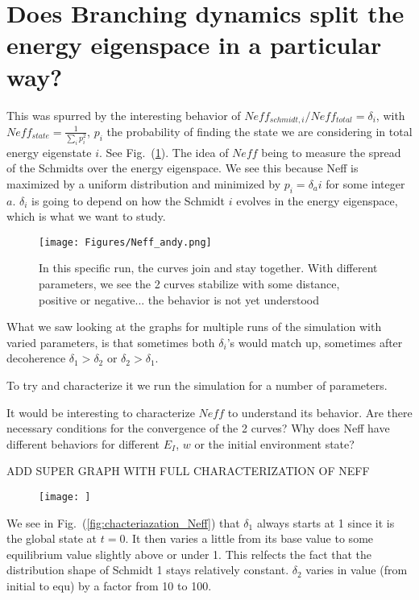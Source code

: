 \documentclass{article}
\begin{document}
\section{Does Branching dynamics split the energy eigenspace in a particular way?}

This was spurred by the interesting behavior of $Neff_{schmidt,i}/Neff_{total}=\delta_i$, with $Neff_{state}=\frac{1}{\sum_ip_i^2}$, $p_i$ the probability of finding the state we are considering in total energy eigenstate $i$. See Fig.~(\ref{fig:Neff_andy}). The idea of $Neff$ being to measure the spread of the Schmidts over the energy eigenspace. We see this because Neff is maximized by a uniform distribution and minimized by $p_i=\delta_ai$ for some integer $a$. $\delta_i$ is going to depend on how the Schmidt $i$ evolves in the energy eigenspace, which is what we want to study.

\begin{figure}
    \centering
    \texttt{[image: Figures/Neff\_andy.png]}
    \caption{In this specific run, the curves join and stay together. With different parameters, we see the 2 curves stabilize with some distance, positive or negative... the behavior is not yet understood}
    \label{fig:Neff_andy}
\end{figure}

What we saw looking at the graphs for multiple runs of the simulation with varied parameters, is that sometimes both $\delta_i$'s would match up, sometimes after decoherence $\delta_1>\delta_2$ or $\delta_2>\delta_1$.

To try and characterize it we run the simulation for a number of parameters.

It would be interesting to characterize $Neff$ to understand its behavior. Are there necessary conditions for the convergence of the 2 curves? Why does Neff have different behaviors for different $E_I$, $w$ or the initial environment state? 



ADD SUPER GRAPH WITH FULL CHARACTERIZATION OF NEFF  
\begin{figure}
    \centering
    \texttt{[image: ]}
    \caption{}
    \label{fig:characteriazation_Neff}
\end{figure}

We see in Fig.~(\ref{fig:chacteriazation_Neff}) that $\delta_1$ always starts at 1 since it is the global state at $t=0$. It then varies a little from its base value to some equilibrium value slightly above or under 1. This relfects the fact that the distribution shape of Schmidt 1 stays relatively constant. 
$\delta_2$ varies in value (from initial to equ) by a factor from 10 to 100.
\end{document}
